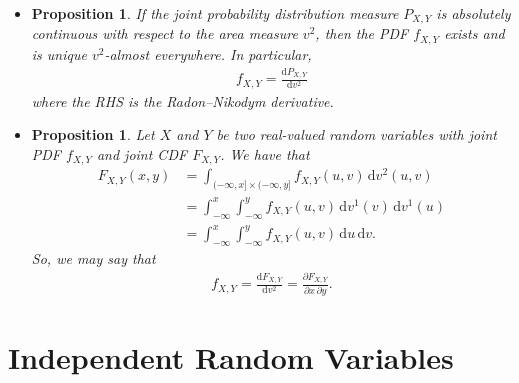 \documentclass[10pt]{article}
\newtheorem{proposition}[lemma]{Proposition}
\numberwithin{lemma}{section}
\newcommand{\dee}{\mathrm{d}}
\begin{document}
\begin{itemize}
  \item \begin{proposition}
    If the joint probability distribution measure $P_{X,Y}$ is absolutely continuous with respect to the area measure $v^2$, then the PDF $f_{X,Y}$ exists and is unique $v^2$-almost everywhere. In particular,
    \begin{align*}
      f_{X,Y} = \frac{\dee P_{X,Y}}{\dee v^2}
    \end{align*}
    where the RHS is the Radon--Nikodym derivative.
  \end{proposition}

  \item \begin{proposition}
    Let $X$ and $Y$ be two real-valued random variables with joint PDF $f_{X,Y}$ and joint CDF $F_{X,Y}$. We have that
    \begin{align*}
      F_{X,Y}(x,y) 
      &= \int_{(-\infty,x] \times (-\infty,y]} f_{X,Y}(u,v)\, \dee v^2(u,v) \\
      &= \int_{-\infty}^x \int_{-\infty}^y f_{X,Y}(u,v)\, \dee v^1(v)\, \dee v^1(u) \\
      &= \int_{-\infty}^x \int_{-\infty}^y f_{X,Y}(u,v)\, \dee u\,\dee v.
    \end{align*}
    So, we may say that
    \begin{align*}
      f_{X,Y} = \frac{\dee F_{X,Y}}{\dee v^2} = \frac{\partial F_{X,Y}}{\partial x \, \partial y}. 
    \end{align*}
  \end{proposition}
\end{itemize}

\section{Independent Random Variables}
\end{document}
